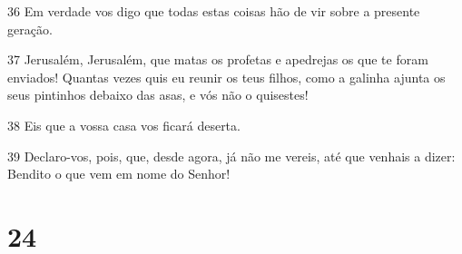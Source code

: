\par 36 Em verdade vos digo que todas estas coisas hão de vir sobre a presente geração.
\par 37 Jerusalém, Jerusalém, que matas os profetas e apedrejas os que te foram enviados! Quantas vezes quis eu reunir os teus filhos, como a galinha ajunta os seus pintinhos debaixo das asas, e vós não o quisestes!
\par 38 Eis que a vossa casa vos ficará deserta.
\par 39 Declaro-vos, pois, que, desde agora, já não me vereis, até que venhais a dizer: Bendito o que vem em nome do Senhor!

\chapter{24}

